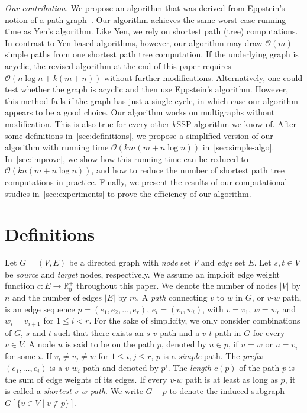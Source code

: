 \documentclass[runningheads,a4paper]{llncs}
\newcommand{\norm}[1]{\left|#1\right|}
\begin{document}
\emph{Our contribution.}
We propose an algorithm that was derived from Eppstein's notion of a path graph~\cite{DBLP:journals/siamcomp/Eppstein98}.
Our algorithm achieves the same worst-case running time as Yen's algorithm.
Like Yen, we rely on shortest path (tree) computations.
In contrast to Yen-based algorithms, however, our algorithm may draw $\mathcal O(m)$ simple paths from one shortest path tree computation.
If the underlying graph is acyclic, the revised algorithm at the end of this paper requires $\mathcal O(n \log n + k(m + n))$ without further modifications.
Alternatively, one could test whether the graph is acyclic and then use Eppstein's algorithm.
However, this method fails if the graph has just a single cycle, in which case our algorithm appears to be a good choice.
Our algorithm works on multigraphs without modification.
This is also true for every other $k$SSP algorithm we know of.
After some definitions in~\autoref{sec:definitions}, we propose a simplified version of our algorithm with running time $\mathcal O(km(m + n \log n))$ in~\autoref{sec:simple-algo}.
In~\autoref{sec:improve}, we show how this running time can be reduced to $\mathcal O(kn(m + n \log n))$, and how to reduce the number of shortest path tree computations in practice.
Finally, we present the results of our computational studies in~\autoref{sec:experiments} to prove the efficiency of our algorithm.


\section{Definitions}
\label{sec:definitions}

Let $G = (V, E)$ be a directed graph with \emph{node} set $V$ and \emph{edge} set $E$.
Let $s, t \in V$ be \emph{source} and \emph{target} nodes, respectively.
We assume an implicit edge weight function $c: E \to \mathbb R^+_0$ throughout this paper.
We denote the number of nodes $\norm V$ by $n$ and the number of edges $\norm E$ by $m$.
A \emph{path} connecting $v$ to $w$ in $G$, or $v$-$w$ path, is an edge sequence $p = (e_1, e_2, \ldots, e_r)$, $e_i = (v_i, w_i)$, with $v = v_1$, $w = w_r$ and $w_i = v_{i + 1}$ for $1 \le i < r$.
For the sake of simplicity, we only consider combinations of $G$, $s$ and $t$ such that there exists an $s$-$v$ path and a $v$-$t$ path in $G$ for every $v \in V$.
A node $u$ is said to be on the path $p$, denoted by $u \in p$, if $u = w$ or $u = v_i$ for some $i$.
If $v_i \neq v_j \neq w$ for $1 \leq i, j \leq r$, $p$ is a \emph{simple} path.
The \emph{prefix} $(e_1, \ldots, e_i)$ is a $v$-$w_i$ path and denoted by $p^i$.
The \emph{length} $c(p)$ of the path $p$ is the sum of edge weights of its edges.
If every $v$-$w$ path is at least as long as $p$, it is called a \emph{shortest $v$-$w$ path}.
We write $G - p$ to denote the induced subgraph $G[\{ v \in V \mid v \notin p\}]$.
\end{document}
